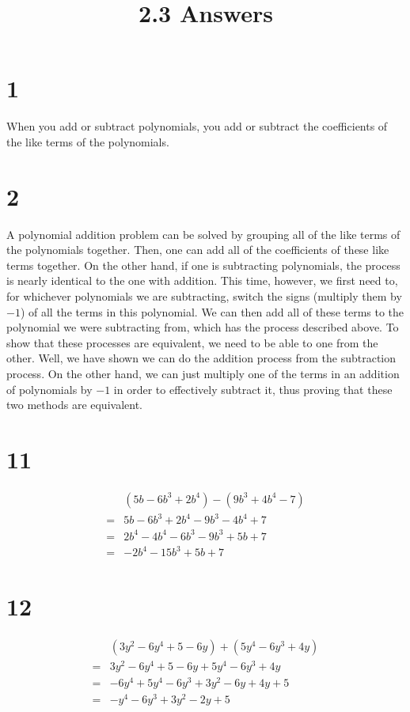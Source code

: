 \documentclass{article}
\title{2.3 Answers}
\theoremstyle{definition}
\begin{document}
\maketitle

\section*{1}
When you add or subtract polynomials, you add or subtract the coefficients of the like terms of the polynomials.

\section*{2}
A polynomial addition problem can be solved by grouping all of the like terms of the polynomials together. Then, one can add all of the coefficients 
of these like terms together. On the other hand, if one is subtracting polynomials, the process is nearly identical to the one with addition. This time, 
however, we first need to, for whichever polynomials we are subtracting, switch the signs (multiply them by $-1$) of all the terms in this polynomial. 
We can then add all of these terms to the polynomial we were subtracting from, which has the process described above. To show that these processes are 
equivalent, we need to be able to one from the other. Well, we have shown we can do the addition process from the subtraction process. On the other hand, 
we can just multiply one of the terms in an addition of polynomials by $-1$ in order to effectively subtract it, thus proving that these two methods are 
equivalent.

\section*{11}
\[
\begin{array}{rl}
        & (5b-6b^3+2b^4)-(9b^3+4b^4-7) \\
=	& 5b-6b^3+2b^4-9b^3-4b^4+7 \\
=	& 2b^4-4b^4-6b^3-9b^3+5b+7 \\
=	& -2b^4-15b^3+5b+7 
\end{array}
\]

\section*{12}
\[
\begin{array}{rl}
	& (3y^2-6y^4+5-6y)+(5y^4-6y^3+4y) \\
=	& 3y^2-6y^4+5-6y+5y^4-6y^3+4y \\
=	& -6y^4+5y^4-6y^3+3y^2-6y+4y+5 \\
=	& -y^4-6y^3+3y^2-2y+5
\end{array}
\]
\end{document}
